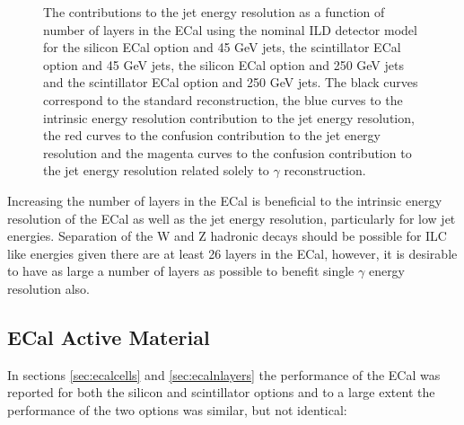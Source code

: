 \begin{figure}[h!]
\caption[The contributions to the jet energy resolution as a function of number of layers in the ECal using the nominal ILD detector model for \protect{} the silicon ECal option and 45 GeV jets, \protect{} the scintillator ECal option and 45 GeV jets, \protect{} the silicon ECal option and 250 GeV jets and \protect{} the scintillator ECal option and 250 GeV jets.  The black curves correspond to the standard reconstruction, the blue curves to the intrinsic energy resolution contribution to the jet energy resolution, the red curves to the confusion contribution to the jet energy resolution and the magenta curves to the confusion contribution to the jet energy resolution related solely to $\gamma$ reconstruction.]{The contributions to the jet energy resolution as a function of number of layers in the ECal using the nominal ILD detector model for \protect{} the silicon ECal option and 45 GeV jets, \protect{} the scintillator ECal option and 45 GeV jets, \protect{} the silicon ECal option and 250 GeV jets and \protect{} the scintillator ECal option and 250 GeV jets.  The black curves correspond to the standard reconstruction, the blue curves to the intrinsic energy resolution contribution to the jet energy resolution, the red curves to the confusion contribution to the jet energy resolution and the magenta curves to the confusion contribution to the jet energy resolution related solely to $\gamma$ reconstruction.}
\label{fig:ecalnlayersbreak}
\end{figure}

Increasing the number of layers in the ECal is beneficial to the intrinsic energy resolution of the ECal as well as the jet energy resolution, particularly for low jet energies.  Separation of the W and Z hadronic decays should be possible for ILC like energies given there are at least 26 layers in the ECal, however, it is desirable to have as large a number of layers as possible to benefit single $\gamma$ energy resolution also.  


\subsection{ECal Active Material}
In sections \ref{sec:ecalcells} and \ref{sec:ecalnlayers} the performance of the ECal was reported for both the silicon and scintillator options and to a large extent the performance of the two options was similar, but not identical:

